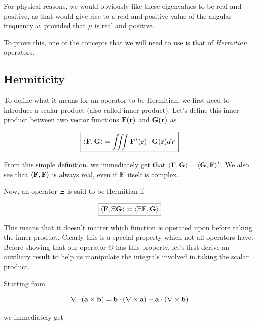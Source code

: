 For physical reasons, we would obviously like these eigenvalues to be real and positive, as that would give rise to a real and positive value of the angular frequency $\omega$, provided that $\mu$ is real and positive.

To prove this, one of the concepts that we will need to use is that of \emph{Hermitian} operators.

\subsection{Hermiticity}

To define what it means for an operator to be Hermitian, we first need to introduce a scalar product (also called inner product). Let's define this inner product between two vector functions ${\bf F({\bf r})}$ and ${\bf G({\bf r})}$ as

\begin{equation}
\fbox{$\displaystyle
\left\langle {\bf F}, {\bf G}\right\rangle = \iiint {\bf F^*({\bf r})} \cdot {\bf G({\bf r})} dV
$}
\end{equation} 

From this simple definition. we immediately get that $\left\langle {\bf F}, {\bf G}\right\rangle = \left\langle {\bf G}, {\bf F}\right\rangle ^*$. We also see that $\left\langle {\bf F}, {\bf F}\right\rangle$ is always real, even if ${\bf F}$ itself is complex.

Now, an operator $\Xi$ is said to be Hermitian if

\begin{equation}
\fbox{$\displaystyle
\left\langle {\bf F}, \Xi {\bf G}\right\rangle = \left\langle \Xi {\bf F}, {\bf G}\right\rangle
$}
\end{equation} 

This means that it doesn't matter which function is operated upon before taking the inner product. Clearly this is a special property which not all operators have. Before showing that our operator $\Theta$ has this property, let's first derive an auxiliary result to help us manipulate the integrals involved in taking the scalar product. 

Starting from

\begin{equation}
\nabla \cdot ({\bf a} \times {\bf b}) = {\bf b} \cdot ( \nabla \times {\bf a}) - {\bf a}  \cdot (\nabla \times {\bf b})
\end{equation} 

we immediately get

